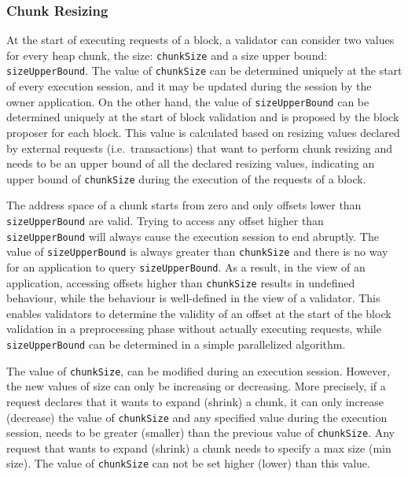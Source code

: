\subsubsection{Chunk Resizing}\label{subsubsec:ch-resize}

At the start of executing requests of a block, a validator can consider two values for every
heap chunk, the size: \texttt{chunkSize} and a size upper bound: \texttt{sizeUpperBound}. The value of
\texttt{chunkSize} can be determined uniquely at the start of
every execution session, and it may be updated during the session by the owner application. On the other hand,
the value of \texttt{sizeUpperBound} can be determined uniquely at the start of block validation and is proposed by the
block proposer for each block. This value is calculated based on resizing values
declared by external requests (i.e.\ transactions) that want to perform chunk resizing and needs to be
an upper bound of all the declared resizing values, indicating an upper bound of \texttt{chunkSize} during the
execution of the requests of a block.

The address space of a chunk starts from zero and only offsets lower than \texttt{sizeUpperBound} are valid. Trying to
access any offset higher than \texttt{sizeUpperBound} will always cause the execution session to end abruptly. The
value of \texttt{sizeUpperBound} is always greater than \texttt{chunkSize} and there is no way for an application to
query \texttt{sizeUpperBound}. As a result, in the view of an application,
accessing offsets higher than \texttt{chunkSize} results in undefined behaviour, while the behaviour is
well-defined in the view of a validator.
This enables validators to determine the validity of an offset at the start of the block validation in a
preprocessing phase without actually executing requests, while \texttt{sizeUpperBound} can be determined in a simple
parallelized algorithm.

The value of \texttt{chunkSize}, can be modified during an execution session. However, the new values of size can
only be increasing or decreasing. More precisely, if a request declares that it wants to expand (shrink) a chunk, it
can only increase (decrease) the value of \texttt{chunkSize} and any specified value during the execution
session, needs to be greater (smaller) than the previous value of \texttt{chunkSize}. Any request that wants to
expand (shrink) a chunk needs to specify a max size (min size). The value of \texttt{chunkSize} can not be set higher
(lower) than this value.

